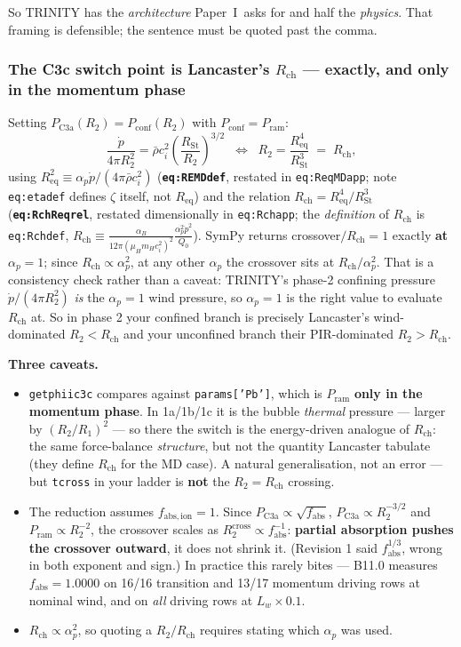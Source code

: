 \documentclass[11pt,a4paper,oneside]{report}
\newcommand{\brkus}{\textunderscore\allowbreak}
\newcommand{\code}[1]{\texttt{\small\let\_\brkus #1}}
\newcommand{\lbl}[1]{\texttt{\footnotesize\let\_\brkus #1}}
\newcommand{\PI}{Paper~I}
\newcommand{\Rch}{R_{\mathrm{ch}}}
\newcommand{\Req}{R_{\mathrm{eq}}}
\newcommand{\RSt}{R_{\mathrm{St}}}
\newcommand{\pdotw}{\dot p}
\newcommand{\ap}{\alpha_p}
\newcommand{\Pram}{P_{\mathrm{ram}}}
\newcommand{\Pconf}{P_{\mathrm{conf}}}
\newcommand{\PCa}{P_{\mathrm{C3a}}}
\newcommand{\ci}{c_i}
\newcommand{\rhobar}{\bar\rho}
\newcommand{\up}[1]{\textcolor{tqaccent}{\textbf{#1}}}
\begin{document}
So TRINITY has the \emph{architecture} \PI\ asks for and half the \emph{physics}. That
framing is defensible; the sentence must be quoted past the comma.

\subsubsection*{The C3c switch point is Lancaster's $\Rch$ --- exactly, and only in the
momentum phase}

Setting $\PCa(R_2)=\Pconf(R_2)$ with $\Pconf=\Pram$:
\[
\frac{\pdotw}{4\pi R_2^2}=\rhobar \ci^2\!\left(\frac{\RSt}{R_2}\right)^{3/2}
\;\;\Longleftrightarrow\;\;
R_2=\frac{\Req^4}{\RSt^3}\;=\;\Rch ,
\]
using $\Req^2 \equiv \ap\pdotw/(4\pi\rhobar \ci^2)$ (\up{\lbl{eq:RE\_MD\_def}}, restated in
\lbl{eq:ReqMD\_app}; note \lbl{eq:eta\_def} defines $\zeta$ itself, not $\Req$) and the relation
$\Rch=\Req^4/\RSt^3$ (\up{\lbl{eq:Rch\_Req\_rel}}, restated dimensionally in
\lbl{eq:Rch\_app}; the \emph{definition} of $\Rch$ is \lbl{eq:Rch\_def},
$\Rch\equiv\frac{\alpha_B}{12\pi(\mu_Hm_H\ci^2)^2}\frac{\ap^2\pdotw^2}{Q_0}$). SymPy returns
crossover$/\Rch = 1$ exactly \up{at $\ap=1$}; since $\Rch\propto\ap^2$, at any other $\ap$ the
crossover sits at $\Rch/\ap^2$. That is a consistency check rather than a caveat: TRINITY's phase-2
confining pressure $\pdotw/(4\pi R_2^2)$ \emph{is} the $\ap=1$ wind pressure, so $\ap=1$ is the
right value to evaluate $\Rch$ at. So in phase 2 your confined branch is precisely Lancaster's
wind-dominated $R_2<\Rch$ and your unconfined branch their PIR-dominated $R_2>\Rch$.

\medskip
\textbf{Three caveats.}
\begin{itemize}
\item \code{get\_phii\_c3c} compares against \code{params['Pb']}, which is $\Pram$
      \up{only in the momentum phase}. In 1a/1b/1c it is the bubble \emph{thermal} pressure
      --- larger by $(R_2/R_1)^2$ --- so there the switch is the energy-driven analogue of
      $\Rch$: the same force-balance \emph{structure}, but not the quantity Lancaster
      tabulate (they define $\Rch$ for the MD case). A natural generalisation, not an
      error --- but \code{t\_cross} in your ladder is \up{not} the $R_2=\Rch$ crossing.
\item The reduction assumes $f_{\mathrm{abs,ion}}=1$. Since $\PCa\propto\sqrt{f_{\mathrm{abs}}}$,
      $\PCa\propto R_2^{-3/2}$ and $\Pram\propto R_2^{-2}$, the crossover scales as
      $R_2^{\mathrm{cross}}\propto f_{\mathrm{abs}}^{-1}$: \up{partial absorption pushes the
      crossover outward}, it does not shrink it. (Revision 1 said $f_{\mathrm{abs}}^{1/3}$,
      wrong in both exponent and sign.) In practice this rarely bites --- B11.0 measures
      $f_{\mathrm{abs}}=1.0000$ on 16/16 transition and 13/17 momentum driving rows at
      nominal wind, and on \emph{all} driving rows at $L_w\times0.1$.
\item $\Rch \propto \ap^2$, so quoting a $R_2/\Rch$ requires stating which $\ap$ was used.
\end{itemize}
\end{document}
